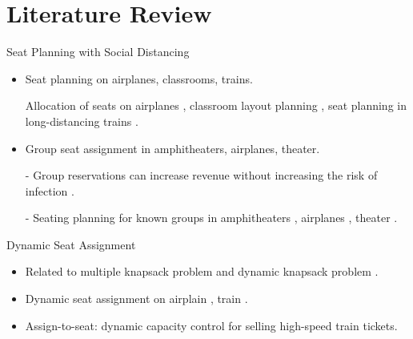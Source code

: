 
\section{Literature Review}
    \frame{\sectionpage}
    \begin{frame}{Seat Planning with Social Distancing}
      \begin{itemize}
        \item Seat planning on airplanes, classrooms, trains.

        Allocation of seats on airplanes \cite{ghorbani2020model}, classroom layout planning \cite{bortolete2022support}, seat planning in long-distancing trains \cite{haque2022optimization}.
        \vspace*{0.5cm}
        \item Group seat assignment in amphitheaters, airplanes, theater.

        \item[-] Group reservations can increase revenue without increasing the risk of infection \cite{moore2021seat}.
        \vspace*{0.5cm}

        \item[-] Seating planning for known groups in amphitheaters \cite{haque2022optimization}, airplanes \cite{salari2022social}, theater \cite{blom2022filling}.
      \end{itemize}
      \end{frame}
      
      \begin{frame}{Dynamic Seat Assignment}
        \begin{itemize}
          \item Related to multiple knapsack problem \cite{pisinger1999exact} and dynamic knapsack problem \cite{kleywegt1998dynamic}.
          \vspace*{0.5cm}
          \item Dynamic seat assignment on airplain \cite{hamdouch2011schedule}, train \cite{berge1993demand, zhu2023assign}.
          \vspace*{0.5cm}
          \item Assign-to-seat: dynamic capacity control for selling high-speed train tickets. \cite{zhu2023assign}
        \end{itemize}
      \end{frame}